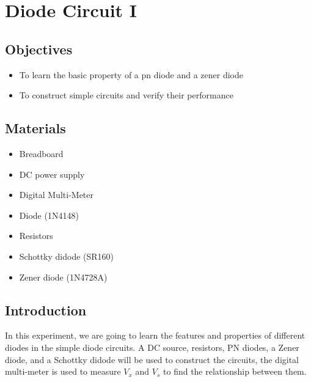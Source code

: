 \chapter{Diode Circuit I}

\section{Objectives}
\begin{itemize}
    \item To learn the basic property of a pn diode and a zener diode
    \item To construct simple circuits and verify their performance
\end{itemize}

\section{Materials}
\begin{itemize}
    \item Breadboard
    \item DC power supply
    \item Digital Multi-Meter
    \item Diode (1N4148)
    \item Resistors
    \item Schottky didode (SR160)
    \item Zener diode (1N4728A)
\end{itemize}

\section{Introduction}
In this experiment, we are going to learn the features and properties of different diodes in the simple diode circuits. A DC source, resistors, PN diodes, a Zener diode, and a Schottky didode will be used to construct the circuits, the digital multi-meter is used to measure $V_x$ and $V_s$ to find the relationship between them.\par
